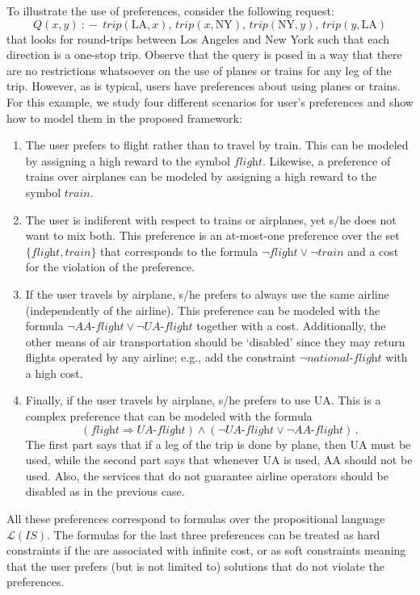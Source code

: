 \documentclass{llncs}
\newcommand{\qrule}{:\!\!-}
\renewcommand{\L}{\mathcal{L}}
\newcommand{\trip}{\textit{trip}}
\newcommand{\AAflight}{\textit{AA-flight}}
\newcommand{\UAflight}{\textit{UA-flight}}
\newcommand{\flight}{\textit{flight}}
\newcommand{\train}{\textit{train}}
\renewcommand{\AA}{\text{AA}}
\newcommand{\UA}{\text{UA}}
\newcommand{\NY}{\text{NY}}
\newcommand{\LA}{\text{LA}}
\newcommand{\nationalFlight}{\textit{national-flight}}
\begin{document}
To illustrate the use of preferences, consider the following request:
\[ Q(x,y)\ \qrule\ \trip(\LA,x),\,\trip(x,\NY),\,\trip(\NY,y),\,\trip(y,\LA) \]
that looks for round-trips between Los Angeles and New York such that
each direction is a one-stop trip. Observe that the query is posed in 
a way that there are no restrictions whatsoever on the use of planes or
trains for any leg of the trip. However, as is typical, users have 
preferences about using planes or trains.
For this example, we study four different scenarios for user's preferences
and show how to model them in the proposed framework:
\begin{enumerate}[P1.]
\item The user prefers to flight rather than to travel by train. This can be
      modeled by assigning a high reward to the symbol $\flight$. Likewise, a
      preference of trains over airplanes can be modeled by assigning a high
      reward to the symbol $\train$.
\item The user is indiferent with respect to trains or airplanes, yet
      s/he does not want to mix both. This preference is an at-most-one preference
      over the set $\{\flight,\train\}$ that corresponds to the formula
      $\neg\flight \lor \neg\train$ and a cost for the violation of the
      preference.
\item If the user travels by airplane, s/he prefers to always use the same
      airline (independently of the airline). This preference can be modeled
      with the formula $\neg\AAflight \lor \neg\UAflight$ together with a
      cost. Additionally, the other means of air transportation should be
      `disabled' since they may return flights operated by any airline;
      e.g., add the constraint $\neg\nationalFlight$ with a high cost.
\item Finally, if the user travels by airplane, s/he prefers to use $\UA$.
      This is a complex preference that can be modeled with the formula
\[ (\flight \Rightarrow \UAflight) \land (\neg\UAflight \lor \neg\AAflight)\,. \]
      The first part says that if a leg of the trip is done by plane, then $\UA$
      must be used, while the second part says that whenever $\UA$ is used,
      $\AA$ should not be used. Also, the services that do not guarantee
      airline operators should be disabled as in the previous case.
\end{enumerate}
All these preferences correspond to formulas over the propositional language
$\L(IS)$. The formulas for the last three preferences can be treated as
hard constraints if the are associated with infinite cost, or as soft
constraints meaning that the user prefers (but is not limited to) solutions
that do not violate the preferences.
\end{document}
